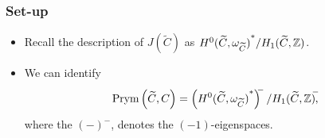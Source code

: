 \begin{frame}
\frametitle{Set-up}

\begin{itemize}
	\item Recall the description of $J(\widetilde C)$ as ${H^0(\widetilde C, \omega_{\widetilde C})}^{\ast}/H_1(\widetilde C, \mathbb{Z})$.
	\item We can identify
	\alert{
	\[
	\operatorname{Prym}\left(\widetilde C, C\right) = \left({H^0(\widetilde C, \omega_{\widetilde C})}^{\ast}\right)^{\mkern-7mu-} / {H_1(\widetilde C, \mathbb{Z})}^{\mkern-7mu-}\mkern-7mu,
	\]
	}
	where the $(-)^-$, denotes the $(-1)$-eigenspaces.
\end{itemize}



\end{frame}


    \begin{frame}[plain]
     \end{frame}

